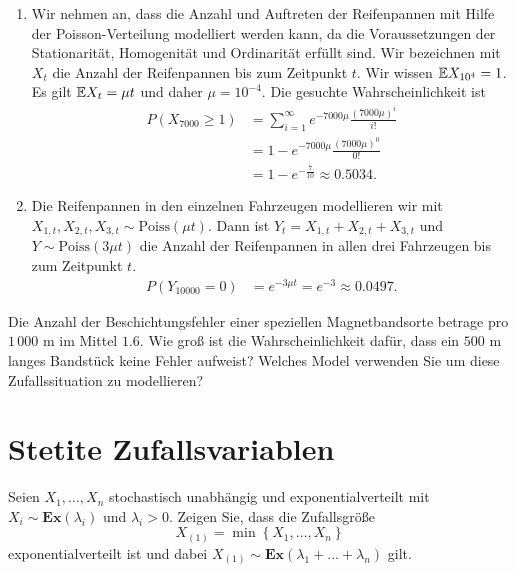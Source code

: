 \solution
\begin{enumerate}
    \item Wir nehmen an, dass die Anzahl und Auftreten der Reifenpannen mit
        Hilfe der Poisson-Verteilung modelliert werden kann, da die
        Voraussetzungen der Stationarität, Homogenität und Ordinarität erfüllt
        sind.  Wir bezeichnen mit $X_t$ die Anzahl der Reifenpannen bis zum
        Zeitpunkt $t$.  Wir wissen $\mathbb E X_{10^4} = 1$. Es gilt $\mathbb E X_{t} = \mu
        t$ und daher $\mu = 10^{-4}$. Die gesuchte Wahrscheinlichkeit ist
        \begin{align*}
            P(X_{7000} \geq 1) &= \sum_{i=1}^{\infty} e^{-7000 \mu} \frac{ \left( 7000 \mu \right)^{i} }{i!} \\
            &= 1 - e^{-7000 \mu} \frac{ (7000 \mu)^{0} }{0!} \\ 
            &= 1 - e^{-\frac{7}{10}} \approx 0.5034.
        \end{align*}

    \item Die Reifenpannen in den einzelnen Fahrzeugen modellieren wir mit
        $X_{1,t}, X_{2,t}, X_{3,t} \sim \text{Poiss}(\mu t)$. Dann ist
        $Y_t=X_{1,t}+X_{2,t}+X_{3,t}$ und $Y \sim \text{Poiss}(3\mu t)$ die
        Anzahl der Reifenpannen in allen drei Fahrzeugen bis zum Zeitpunkt $t$.
        \begin{align*}
            P(Y_{10000} = 0) &= e^{ - 3 \mu t } = e^{-3} \approx 0.0497.
        \end{align*}
\end{enumerate}

 Die Anzahl der Beschichtungsfehler einer
speziellen Magnetbandsorte betrage pro $1\, 000$ m im Mittel $1.6$. Wie groß
ist die Wahrscheinlichkeit dafür, dass ein $500$ m langes Bandstück keine
Fehler aufweist? Welches Model verwenden Sie um diese Zufallssituation zu
modellieren? 

\section{Stetite Zufallsvariablen}


Seien $X_1, \dots, X_n$ stochastisch unabhängig und exponentialverteilt mit
$X_i\sim \mathbf{Ex}(\lambda_i)$ und $\lambda_i>0$. Zeigen Sie, dass die
Zufallsgröße 
\begin{equation*}
    X_{(1)} = \min \left\{ X_1, \dots, X_n \right\} 
\end{equation*}
exponentialverteilt ist und dabei $X_{(1)} \sim \mathbf{Ex}(\lambda_1+\dots+\lambda_n)$ gilt.



